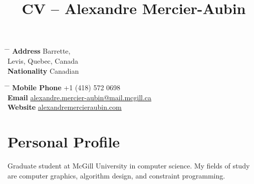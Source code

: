 \documentclass[10pt]{article} %
\begin{document}

\title{CV -- Alexandre Mercier-Aubin} %


\parbox{0.5\textwidth}{ %
\begin{tabbing} %
\hspace{3cm} \= \hspace{4cm} \= \kill %
{\bf Address}  Barrette,\\ %
\> Levis, Quebec, Canada \\ %
{\bf Nationality} \> Canadian %
\end{tabbing}}
\hfill %
\parbox{0.5\textwidth}{ %
\begin{tabbing} %
\hspace{3cm} \= \hspace{4cm} \= \kill %
{\bf Mobile Phone} \> +1 (418) 572 0698 \\ %
{\bf Email} \> \href{mailto:alexandre.mercier-aubin@mail.mcgill.ca}{alexandre.mercier-aubin@mail.mcgill.ca} \\ %
{\bf Website} \> \href{https://alexandremercieraubin.com}{alexandremercieraubin.com} \\
\end{tabbing}}


\section{Personal Profile}

Graduate student at McGill University in computer science. My fields of study are computer graphics, algorithm design, and constraint programming.

\end{document}

